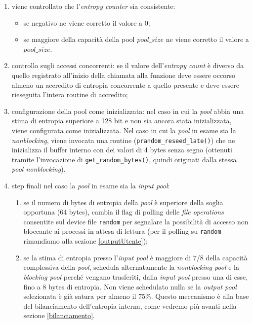 \documentclass{article}
\begin{document}
\begin{enumerate}
   \item viene controllato che l'\emph{entropy counter} sia consistente: 
	\begin {itemize}
	  \item se negativo ne viene corretto il valore a 0;
	  \item se maggiore della capacità della pool $pool\_size$ ne viene corretto
	  il valore a $pool\_size$.
	\end{itemize}
   \item controllo sugli accessi concorrenti: se il valore dell'\emph{entropy
   count} è diverso da quello registrato all'inizio della chiamata alla funzione
   deve essere occorso almeno un accredito di entropia concorrente a quello
   presente e deve essere rieseguita l'intera routine di accredito;
   \item configurazione della pool come inizializzata: nel caso in cui la
   \emph{pool} abbia una stima di entropia superiore a 128 bit e non sia ancora
   stata inizializzata, viene configurata come inizializzata. Nel caso in cui la
   \emph{pool} in esame sia la \emph{nonblocking}, viene invocata una routine
   (\verb+prandom_reseed_late()+) che ne inizializza il buffer interno con dei
   valori di 4 bytes senza segno (ottenuti tramite l'invocazione di
   \verb+get_random_bytes()+, quindi originati dalla stessa \emph{pool
   nonblocking}).
   \item step finali nel caso la \emph{pool} in esame sia la \emph{input pool}: 
       \begin{enumerate}
         \item se il numero di bytes di entropia della \emph{pool} è superiore
         della soglia opportuna (64 bytes), cambia il flag di polling delle
         \emph{file operations} consentite sul device file \verb+random+ per
         segnalare la possibilità di accesso non bloccante ai processi in attesa
         di lettura (per il polling su \verb+random+ rimandiamo alla sezione
         \ref{outputUtente});
         \item se la stima di entropia presso l'\emph{input pool} è maggiore di
         $7/8$ della capacità complessiva della \emph{pool}, schedula
         alternatamente la \emph{nonblocking pool} e la \emph{blocking pool}
         perché vengano trasferiti, dalla \emph{input pool} presso una di esse,
         fino a 8 bytes di entropia. Non viene schedulato nulla se la
         \emph{output pool} selezionata è già satura per almeno il 75\%. Questo
         meccanismo è alla base del bilanciamento dell'entropia interna, come
         vedremo più avanti nella sezione \ref{bilanciamento}.
       \end{enumerate}
   
   \end{enumerate}
 
\end{document}
